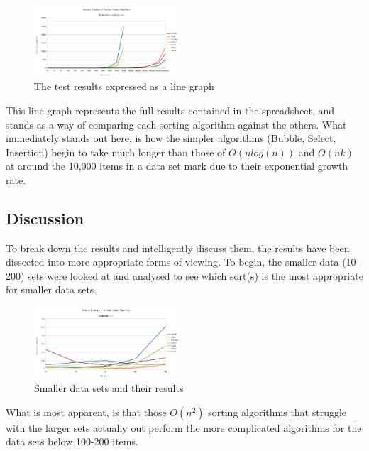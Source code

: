 \documentclass{acm_proc_article-sp}
\begin{document}
\begin{figure}[h]
\centering
\includegraphics[width=0.48\textwidth]{img/graph_all_tests.png}
\caption{The test results expressed as a line graph}
\end{figure}

This line graph represents the full results contained in the spreadsheet, and stands
as a way of comparing each sorting algorithm against the others. What 
immediately stands out here, is how the simpler algorithms (Bubble, Select, Insertion) begin to take much 
longer than those of \begin{math}O(n log(n))\end{math} and \begin{math}O(nk)\end{math}
 at around the 10,000 items in a data set mark due to their exponential growth rate.

\subsection{Discussion}
To break down the results and intelligently discuss them, the results have been dissected
into more appropriate forms of viewing. To begin, the smaller data (10 - 200) sets were looked at and
analysed to see which sort(s) is the most appropriate for smaller data sets.

\begin{figure}[h]
\centering
\includegraphics[width=0.48\textwidth]{img/graph_smaller.png}
\caption{Smaller data sets and their results}
\end{figure}

What is most apparent, is that those \begin{math}O(n^2)\end{math} sorting algorithms
that struggle with the larger sets actually out perform the more complicated algorithms
for the data sets below 100-200 items.
\end{document}
